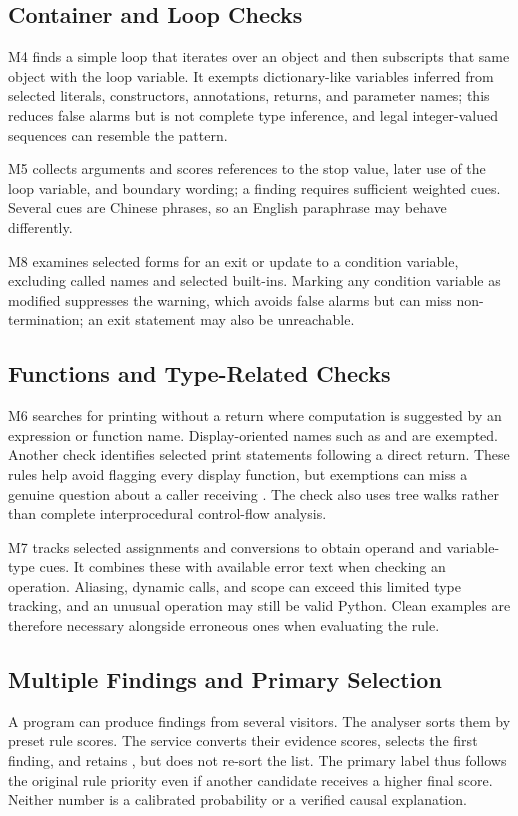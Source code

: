 \subsection{Container and Loop Checks}
M4 finds a simple loop that iterates over an object and then subscripts that same object with the loop variable. It exempts dictionary-like variables inferred from selected literals, constructors, annotations, returns, and parameter names; this reduces false alarms but is not complete type inference, and legal integer-valued sequences can resemble the pattern.

M5 collects  arguments and scores references to the stop value, later use of the loop variable, and boundary wording; a finding requires sufficient weighted cues. Several cues are Chinese phrases, so an English paraphrase may behave differently.

M8 examines selected  forms for an exit or update to a condition variable, excluding called names and selected built-ins. Marking any condition variable as modified suppresses the warning, which avoids false alarms but can miss non-termination; an exit statement may also be unreachable.

\subsection{Functions and Type-Related Checks}
M6 searches for printing without a return where computation is suggested by an expression or function name. Display-oriented names such as  and  are exempted. Another check identifies selected print statements following a direct return. These rules help avoid flagging every display function, but exemptions can miss a genuine question about a caller receiving . The check also uses tree walks rather than complete interprocedural control-flow analysis.

M7 tracks selected assignments and conversions to obtain operand and variable-type cues. It combines these with available error text when checking an operation. Aliasing, dynamic calls, and scope can exceed this limited type tracking, and an unusual operation may still be valid Python. Clean examples are therefore necessary alongside erroneous ones when evaluating the rule.

\subsection{Multiple Findings and Primary Selection}
A program can produce findings from several visitors. The analyser sorts them by preset rule scores. The service converts their evidence scores, selects the first finding, and retains , but does not re-sort the list. The primary label thus follows the original rule priority even if another candidate receives a higher final score. Neither number is a calibrated probability or a verified causal explanation.

